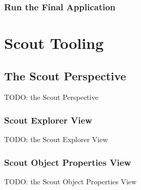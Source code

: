 \documentclass[a4paper,10pt,twoside]{book}
\begin{document}
\subsection*{Run the Final Application}


\chapter*{Scout Tooling}

\section*{The Scout Perspective}
TODO: the Scout Perspective
\subsection*{Scout Explorer View}
TODO: the Scout Explorer View
% 
\subsection*{Scout Object Properties View}
TODO: the Scout Object Properties View
% 

% 
% 
% 
% 



\pagestyle{plain}



% 



~~~~
\end{document}
